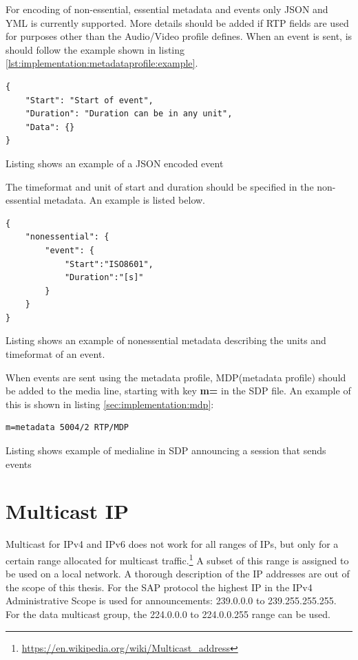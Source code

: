 For encoding of non-essential, essential metadata and events only JSON and YML is currently supported.
More details should be added if RTP fields are used for purposes other than the Audio/Video profile defines. When an event is sent, is should follow the example shown in listing \ref{lst:implementation:metadataprofile:example}.

\begin{listing}[h] 
\begin{verbatim}
{
	"Start": "Start of event",
	"Duration": "Duration can be in any unit",
	"Data": {}
}
\end{verbatim}
\caption{Listing shows an example of a JSON encoded event}
\label{lst:implementation:metadataprofile:example}
\end{listing}
The timeformat and unit of start and duration should be specified in the non-essential metadata. An example is listed below.

\begin{listing}[h] 
\begin{verbatim}
{
	"nonessential": {
		"event": {
			"Start":"ISO8601",
			"Duration":"[s]"
		}
	}
}
\end{verbatim}
\caption{Listing shows an example of nonessential metadata describing the units and timeformat of an event.}
\label{lst:implementation:metadataprofileunits}
\end{listing}

When events are sent using the metadata profile, MDP(metadata profile) should be added to the media line, starting with key \textbf{m=} in the SDP file. An example of this is shown in listing \ref{sec:implementation:mdp}:

\begin{listing}[h] 
\begin{verbatim}
m=metadata 5004/2 RTP/MDP
\end{verbatim}
\caption{Listing shows example of medialine in SDP announcing a session that sends events}
\label{cmd:implementation:mdp}
\end{listing}

\section{Multicast IP} \label{sec:implementation:multicastip}
Multicast for IPv4 and IPv6 does not work for all ranges of IPs, but only for a certain range allocated for multicast traffic.\footnote{\url{https://en.wikipedia.org/wiki/Multicast\_address}} 
A subset of this range is assigned to be used on a local network. 
A thorough description of the IP addresses are out of the scope of this thesis. 
For the SAP protocol\citep{RFC2974} the highest IP in the IPv4 Administrative Scope is used for announcements: 239.0.0.0 to 239.255.255.255. For the data multicast group, the 224.0.0.0 to 224.0.0.255 range can be used.

